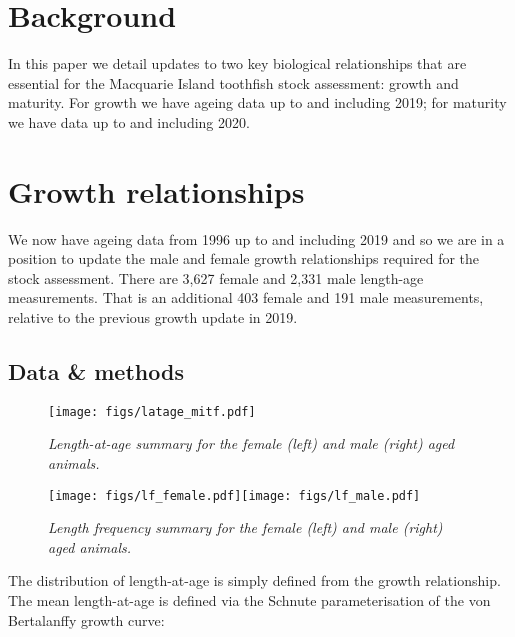 \documentclass[12pt,a4paper,twoside,times,blue,standard]{csiroreport2017}
\begin{document}

\section{Background}

In this paper we detail updates to two key biological relationships that are essential for the Macquarie Island toothfish stock assessment: growth and maturity. For growth we have ageing data up to and including 2019; for maturity we have data up to and including 2020.

\section{Growth relationships}

We now have ageing data from 1996 up to and including 2019 and so we are in a position to update the male and female growth relationships required for the stock assessment. There are 3,627 female and 2,331 male length-age measurements. That is an additional 403 female and 191 male measurements, relative to the previous growth update in 2019.

\subsection{Data \& methods}

\begin{figure}[h]
    \begin{center}
        \texttt{[image: figs/latage\_mitf.pdf]}
    \end{center}
    \caption{\textit{Length-at-age summary for the female (left) and male (right) aged animals.}}
\end{figure}

\begin{figure}
    \begin{center}
        \texttt{[image: figs/lf\_female.pdf]}\texttt{[image: figs/lf\_male.pdf]}
    \end{center}
    \caption{\textit{Length frequency summary for the female (left) and male (right) aged animals.}}
\end{figure}

The distribution of length-at-age is simply defined from the growth relationship. The mean length-at-age is defined via the Schnute parameterisation of the von Bertalanffy growth curve:
\end{document}

